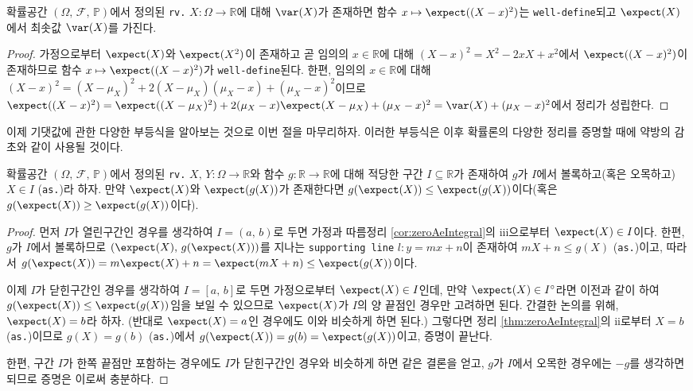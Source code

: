 \begin{theorem}
    확률공간 $(\Omega,\,\mathcal{F},\,\mathbb{P})$에서 정의된 \texttt{rv.} $X:\Omega\to\mathbb{R}$에 대해 $\var(X)$가 존재하면 함수 $x\mapsto\expect((X-x)^2)$는 \texttt{well-define}되고 $\expect(X)$에서 최솟값 $\var(X)$를 가진다.
\end{theorem}

\begin{proof}
    가정으로부터 $\expect(X)$와 $\expect(X^2)$이 존재하고 곧 임의의 $x\in\mathbb{R}$에 대해 $(X-x)^2=X^2-2xX+x^2$에서 $\expect((X-x)^2)$이 존재하므로 함수 $x\mapsto\expect((X-x)^2)$가 \texttt{well-define}된다. 한편, 임의의 $x\in\mathbb{R}$에 대해 $(X-x)^2=(X-\mu_X)^2+2(X-\mu_X)(\mu_X-x)+(\mu_X-x)^2$이므로 $\expect((X-x)^2)=\expect((X-\mu_X)^2)+2(\mu_X-x)\expect(X-\mu_X)+(\mu_X-x)^2=\var(X)+(\mu_X-x)^2$에서 정리가 성립한다.
\end{proof}

이제 기댓값에 관한 다양한 부등식을 알아보는 것으로 이번 절을 마무리하자. 이러한 부등식은 이후 확률론의 다양한 정리를 증명할 때에 약방의 감초와 같이 사용될 것이다.

\begin{theorem}
    확률공간 $(\Omega,\,\mathcal{F},\,\mathbb{P})$에서 정의된 \texttt{rv.} $X,\,Y:\Omega\to\mathbb{R}$와 함수 $g:\mathbb{R}\to\mathbb{R}$에 대해 적당한 구간 $I\subseteq\mathbb{R}$가 존재하여 $g$가 $I$에서 볼록하고(혹은 오목하고) $X\in I$ (\texttt{as.})라 하자. 만약 $\expect(X)$와 $\expect(g(X))$가 존재한다면 $g(\expect(X))\leq\expect(g(X))$이다(혹은 $g(\expect(X))\geq\expect(g(X))$이다).
\end{theorem}

\begin{proof}
    먼저 $I$가 열린구간인 경우를 생각하여 $I=(a,\,b)$로 두면 가정과 따름정리 \ref{cor:zeroAeIntegral}의 iii으로부터 $\expect(X)\in I$이다. 한편, $g$가 $I$에서 볼록하므로 $(\expect(X),\,g(\expect(X)))$를 지나는 \texttt{supporting line} $l:y=mx+n$이 존재하여 $mX+n\leq g(X)$ (\texttt{as.})이고, 따라서 $g(\expect(X))=m\expect(X)+n=\expect(mX+n)\leq\expect(g(X))$이다.

    이제 $I$가 닫힌구간인 경우를 생각하여 $I=[a,\,b]$로 두면 가정으로부터 $\expect(X)\in I$인데, 만약 $\expect(X)\in I^\circ$라면 이전과 같이 하여 $g(\expect(X))\leq\expect(g(X))$임을 보일 수 있으므로 $\expect(X)$가 $I$의 양 끝점인 경우만 고려하면 된다. 간결한 논의를 위해, $\expect(X)=b$라 하자. (반대로 $\expect(X)=a$인 경우에도 이와 비슷하게 하면 된다.) 그렇다면 정리 \ref{thm:zeroAeIntegral}의 ii로부터 $X=b$ (\texttt{as.})이므로 $g(X)=g(b)$ (\texttt{as.})에서 $g(\expect(X))=g(b)=\expect(g(X))$이고, 증명이 끝난다.

    한편, 구간 $I$가 한쪽 끝점만 포함하는 경우에도 $I$가 닫힌구간인 경우와 비슷하게 하면 같은 결론을 얻고, $g$가 $I$에서 오목한 경우에는 $-g$를 생각하면 되므로 증명은 이로써 충분하다.
\end{proof}

